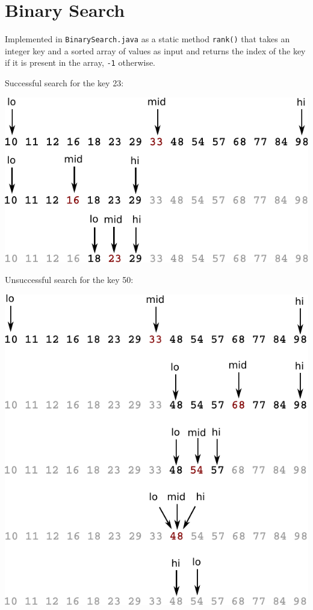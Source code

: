 \documentclass[8pt,a4paper,compress]{beamer}
\begin{document}
\section{Binary Search}
\begin{frame}[fragile]
\pause

Implemented in \lstinline$BinarySearch.java$ as a static method \lstinline$rank()$ that takes an integer key and a sorted array of values as input and returns the index of the key if it is present in the array, \lstinline$-1$ otherwise.

\pause
\smallskip

Successful search for the key 23:

\begin{center}
\includegraphics[scale=0.4]{./figures/bs1.pdf}
\end{center}
\end{frame}

\begin{frame}[fragile]
\pause

Unsuccessful search for the key 50:

\begin{center}
\includegraphics[scale=0.4]{./figures/bs2.pdf}
\end{center}
\end{frame}
\end{document}

